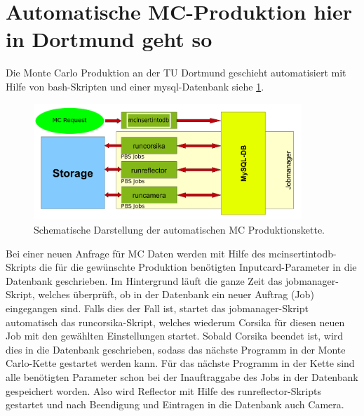 



\section{Automatische MC-Produktion hier in Dortmund geht so}
\label{sec:Automatische MC-Produktion}

Die Monte Carlo Produktion an der TU Dortmund geschieht automatisiert mit Hilfe von bash-Skripten und einer mysql-Datenbank siehe \ref{Jobmanager}.

\begin{figure}
    \centering
    \includegraphics[width=0.9\textwidth]{./Plots/03_MonteCarlos/Jobmanager.png}
    \caption{Schematische Darstellung der automatischen MC Produktionskette.}
    \label{Jobmanager}
\end{figure}


Bei einer neuen Anfrage für MC Daten werden mit Hilfe des mcinsertintodb-Skripts die für die gewünschte Produktion benötigten Inputcard-Parameter in die Datenbank geschrieben.
Im Hintergrund läuft die ganze Zeit das jobmanager-Skript, welches überprüft, ob in der Datenbank ein neuer Auftrag (Job) eingegangen sind.
Falls dies der Fall ist, startet das jobmanager-Skript automatisch das runcorsika-Skript, welches wiederum Corsika für diesen neuen Job mit den gewählten Einstellungen startet.
Sobald Corsika beendet ist, wird dies in die Datenbank geschrieben, sodass das nächste Programm in der Monte Carlo-Kette gestartet werden kann.
Für das nächste Programm in der Kette sind alle benötigten Parameter schon bei der Inauftraggabe des Jobs in der Datenbank gespeichert worden.
Also wird Reflector mit Hilfe des runreflector-Skripts gestartet und nach Beendigung und Eintragen in die Datenbank auch Camera.

